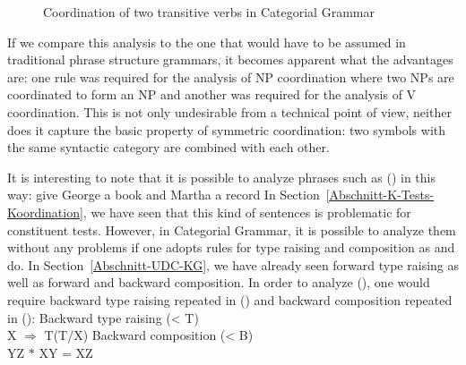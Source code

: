 \begin{exe}
\begin{xlist}[iv.]
\begin{exe}
\begin{xlist}[iv.]
\begin{figure}
\centerline{%
}
\caption{\label{Abb-CG-Koordination-V}Coordination of two transitive verbs in Categorial Grammar}
\end{figure}%

If we compare this analysis to the one that would have to be assumed in traditional phrase structure grammars, it becomes apparent
what the advantages are: one rule was required for the analysis of NP coordination where two NPs are coordinated to form an NP and another was required
for the analysis of V coordination. This is not only undesirable from a technical point of view, neither does it capture the basic property of symmetric coordination:
two symbols with the same syntactic category are combined with each other.

It is interesting to note that it is possible to analyze phrases such as () in this way:
\ea
\label{Beispiel-Gapping-Steedman}
give George a book and Martha a record
\z
In Section~\ref{Abschnitt-K-Tests-Koordination}, we have seen that this kind of sentences is problematic for constituent tests. However, in Categorial Grammar, it is possible to
analyze them without any problems if one adopts rules for type raising and composition as \citet{Dowty88a-u} and \citet{Steedman91a} do.
In Section~\ref{Abschnitt-UDC-KG}, we have already seen forward type raising as well as forward and backward composition. In order to analyze
(), one would require backward type raising repeated in () and backward composition repeated in
():
\ea
Backward type raising (< T)\\
X $\Rightarrow$ T\bs (T/X)
\z
\ea
Backward composition (< B)\\
    Y\bs Z $*$ X\bs Y = X\bs Z
\z


\end{xlist}
\end{exe}
\end{xlist}
\end{exe}
